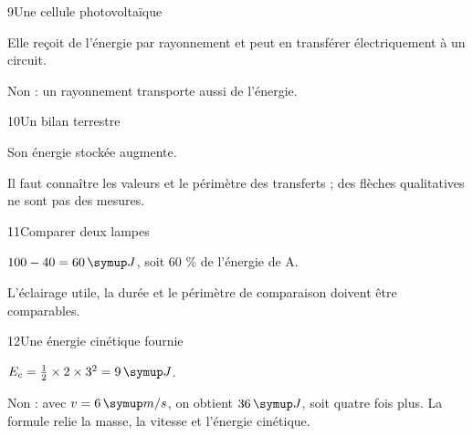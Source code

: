 \par\noindent\begin{minipage}{\linewidth}
\begin{corrige}{9}{Une cellule photovoltaïque}
\begin{questions}
\item Elle reçoit de l’énergie par rayonnement et peut en transférer électriquement à un circuit.
\item Non : un rayonnement transporte aussi de l’énergie.
\end{questions}
\end{corrige}
\end{minipage}
\par\noindent\begin{minipage}{\linewidth}
\begin{corrige}{10}{Un bilan terrestre}
\begin{questions}
\item Son énergie stockée augmente.
\item Il faut connaître les valeurs et le périmètre des transferts ; des flèches qualitatives ne sont pas des mesures.
\end{questions}
\end{corrige}
\end{minipage}
\par\noindent\begin{minipage}{\linewidth}
\begin{corrige}{11}{Comparer deux lampes}
\begin{questions}
\item $100-40=60\unite J$, soit 60 \% de l’énergie de A.
\item L’éclairage utile, la durée et le périmètre de comparaison doivent être comparables.
\end{questions}
\end{corrige}
\end{minipage}
\par\noindent\begin{minipage}{\linewidth}
\begin{corrige}{12}{Une énergie cinétique fournie}
\begin{questions}
\item $E_c=\frac12\times2\times3^2=9\unite J$.
\item Non : avec $v=6\unite{m/s}$, on obtient $36\unite J$, soit quatre fois plus. La formule relie la masse, la vitesse et l’énergie cinétique.
\end{questions}
\end{corrige}
\end{minipage}
